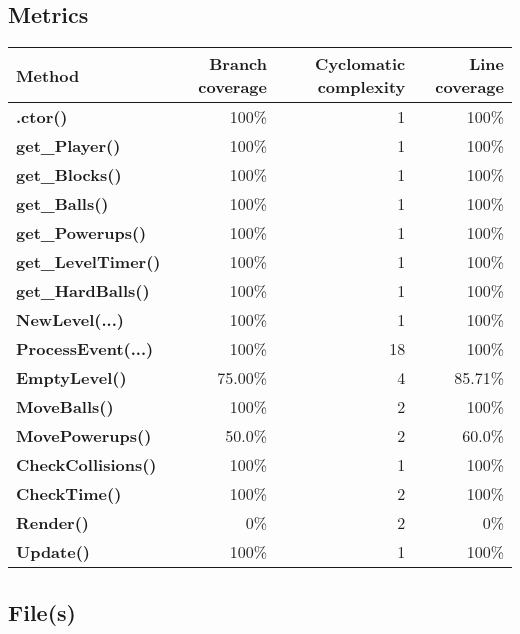 \documentclass[a4paper,landscape,10pt]{article}
\begin{document}
\subsection{Metrics}
\begin{longtable}[l]{|l|r|r|r|}
\hline
\textbf{Method} & \textbf{Branch coverage} & \textbf{Cyclomatic complexity} & \textbf{Line coverage}\\
\hline
\textbf{.ctor()} & 100\% & 1 & 100\%\\
\hline
\textbf{get\_Player()} & 100\% & 1 & 100\%\\
\hline
\textbf{get\_Blocks()} & 100\% & 1 & 100\%\\
\hline
\textbf{get\_Balls()} & 100\% & 1 & 100\%\\
\hline
\textbf{get\_Powerups()} & 100\% & 1 & 100\%\\
\hline
\textbf{get\_LevelTimer()} & 100\% & 1 & 100\%\\
\hline
\textbf{get\_HardBalls()} & 100\% & 1 & 100\%\\
\hline
\textbf{NewLevel(...)} & 100\% & 1 & 100\%\\
\hline
\textbf{ProcessEvent(...)} & 100\% & 18 & 100\%\\
\hline
\textbf{EmptyLevel()} & 75.00\% & 4 & 85.71\%\\
\hline
\textbf{MoveBalls()} & 100\% & 2 & 100\%\\
\hline
\textbf{MovePowerups()} & 50.0\% & 2 & 60.0\%\\
\hline
\textbf{CheckCollisions()} & 100\% & 1 & 100\%\\
\hline
\textbf{CheckTime()} & 100\% & 2 & 100\%\\
\hline
\textbf{Render()} & 0\% & 2 & 0\%\\
\hline
\textbf{Update()} & 100\% & 1 & 100\%\\
\hline
\end{longtable}
\subsection{File(s)}
\end{document}
